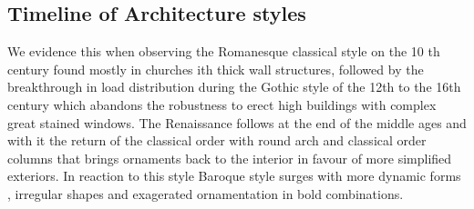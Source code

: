 

\subsection{Timeline of Architecture styles}
\label{subsec:TimelineArchitectureStyles}
We evidence this when observing the Romanesque classical style on the 10 th century found mostly in churches ith thick wall structures, followed by the breakthrough in load distribution during the Gothic style of the 12th to the 16th century which abandons the robustness to erect high buildings with complex great stained windows.
The Renaissance follows at the end of the middle ages and with it the return of the classical order with round arch and classical order columns that brings ornaments back to the interior in favour of more simplified exteriors. In reaction to this style Baroque style surges with more dynamic forms , irregular shapes and exagerated ornamentation in bold combinations.

